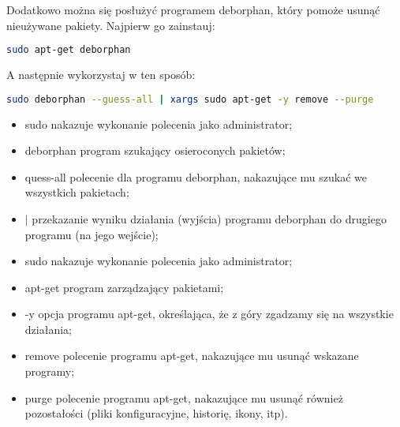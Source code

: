 Dodatkowo można się posłużyć programem \textcolor{ubuntu_orange}{deborphan}, który pomoże usunąć nieużywane pakiety. Najpierw go zainstauj:
\begin{lstlisting}[language=bash]
sudo apt-get deborphan
\end{lstlisting}
A następnie wykorzystaj w ten sposób:
\begin{lstlisting}[language=bash]
sudo deborphan --guess-all | xargs sudo apt-get -y remove --purge
\end{lstlisting}
\begin{itemize}
\item \textcolor{ubuntu_orange}{sudo} nakazuje wykonanie polecenia jako administrator;
\item \textcolor{ubuntu_orange}{deborphan} program szukający osieroconych pakietów;
\item \textcolor{ubuntu_orange}{\-\-quess-all} polecenie dla programu deborphan, nakazujące mu szukać we wszystkich pakietach;
\item \textcolor{ubuntu_orange}{$\vert$} przekazanie wyniku działania (wyjścia) programu deborphan do drugiego programu (na jego wejście);
\item \textcolor{ubuntu_orange}{sudo} nakazuje wykonanie polecenia jako administrator;
\item \textcolor{ubuntu_orange}{apt-get} program zarządzający pakietami;
\item \textcolor{ubuntu_orange}{-y} opcja programu apt-get, określająca, że z góry zgadzamy się na wszystkie działania;
\item \textcolor{ubuntu_orange}{remove} polecenie programu apt-get, nakazujące mu usunąć wskazane programy;
\item \textcolor{ubuntu_orange}{\-\-purge} polecenie programu apt-get, nakazujące mu usunąć również pozostałości (pliki konfiguracyjne, historię, ikony, itp).
\end{itemize}
